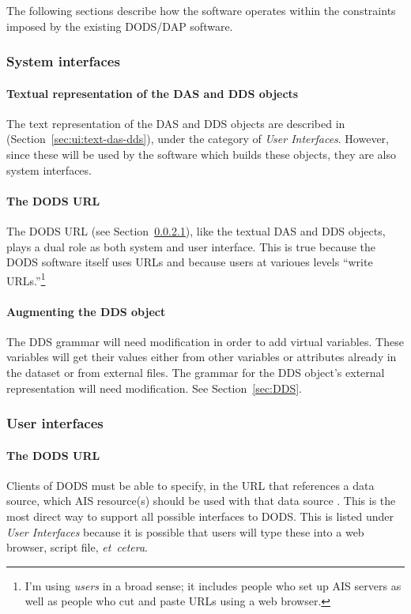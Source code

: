 \documentclass{article}
\begin{document}
The following sections describe how the software operates within
the constraints imposed by the existing \ac{DODS}/\ac{DAP} software.

\subsubsection{System interfaces}
\paragraph{Textual representation of the \ac{DAS} and \ac{DDS} objects}
The text representation of the \ac{DAS} and \ac{DDS} objects are described in
(Section~\ref{sec:ui:text-das-dds}), under the category of \emph{User
  Interfaces}. However, since these will be used by the software which builds
these objects, they are also system interfaces.

\paragraph{The \ac{DODS} \ac{URL}}
The \ac{DODS} \ac{URL} (see Section~\ref{sec:ui:url}), like the textual
\ac{DAS} and \ac{DDS} objects, plays a dual role as both system and user
interface. \cbstart This is true because the \ac{DODS} software itself uses
\ac{URL}s and because users at varioues levels ``write URLs.''\footnote{I'm
  using \emph{users} in a broad sense; it includes people who set up \ac{AIS}
    servers as well as people who cut and paste URLs using a web browser.}
  \cbend

\paragraph{Augmenting the \ac{DDS} object}
\label{sec:augment-dds}
The \ac{DDS} grammar will need modification in order to add virtual
variables. These variables will get their values either from other variables
or attributes already in the dataset or from external files. The grammar for
the \ac{DDS} object's external representation will need modification. See
Section~\ref{sec:DDS}.

\subsubsection{User interfaces}
\label{sec:ui}

\paragraph{The \ac{DODS} \ac{URL}}
\label{sec:ui:url}
Clients of \ac{DODS} must be able to specify, in the \ac{URL} that references
a data source, which \ac{AIS} resource(s) should be used with that data
source . This is the most direct way to support all possible interfaces to
DODS. This is listed under \emph{User Interfaces} because it is possible that
users will type these into a web browser, script file, \emph{et~cetera}.
\end{document}
